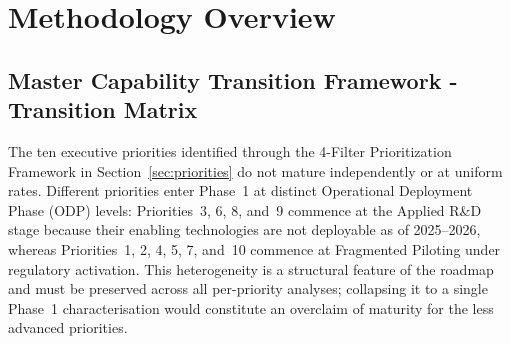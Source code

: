 


\section{Methodology Overview}

\subsection{Master Capability Transition Framework - Transition Matrix}
\label{sec:master_transition}



The ten executive priorities identified through the 4-Filter Prioritization
Framework in Section~\ref{sec:priorities} do not mature independently or at
uniform rates. Different priorities enter Phase~1 at distinct Operational
Deployment Phase (ODP) levels: Priorities~3, 6, 8, and~9 commence at the
Applied R\&D stage because their enabling technologies are not deployable
as of 2025--2026, whereas Priorities~1, 2, 4, 5, 7, and~10 commence at
Fragmented Piloting under regulatory activation. This heterogeneity is a
structural feature of the roadmap and must be preserved across all
per-priority analyses; collapsing it to a single Phase~1 characterisation
would constitute an overclaim of maturity for the less advanced priorities.

